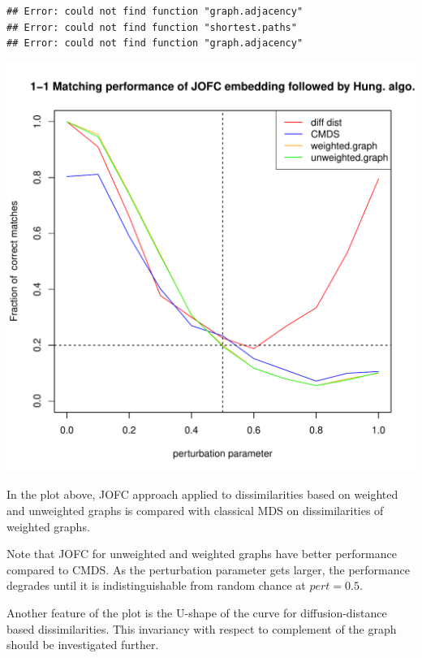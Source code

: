\documentclass[11pt]{article} %
\begin{document}
\begin{knitrout}
\color{fgcolor}\begin{kframe}
\begin{verbatim}
## Error: could not find function "graph.adjacency"
## Error: could not find function "shortest.paths"
## Error: could not find function "graph.adjacency"
\end{verbatim}
\end{kframe}
\end{knitrout}
\begin{knitrout}
\color{fgcolor}\includegraphics{graphs/FidCommPapergraph-plot-1} 
\end{knitrout}


In the plot above, JOFC approach applied to  dissimilarities based on weighted and unweighted graphs is compared with classical MDS on dissimilarities of weighted graphs.

Note that JOFC for unweighted and weighted graphs  have better performance compared to CMDS. As the perturbation parameter gets larger, the performance degrades until it is indistinguishable from random chance at $pert=0.5$.

Another feature of the plot is the U-shape of the curve for diffusion-distance based dissimilarities. This invariancy with respect to complement of the graph should be investigated further.
\end{document}
